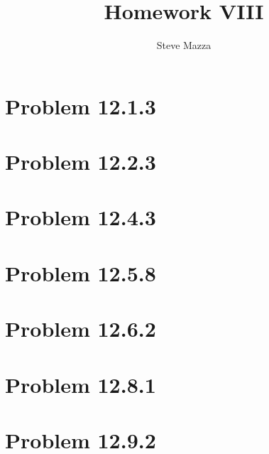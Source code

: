 \documentclass[letterpaper,10pt]{article}
\title{Homework VIII}
\author{Steve Mazza}
\begin{document}
\maketitle

\section*{Problem 12.1.3}

\section*{Problem 12.2.3}

\section*{Problem 12.4.3}

\section*{Problem 12.5.8}

\section*{Problem 12.6.2}

\section*{Problem 12.8.1}

\section*{Problem 12.9.2}
\end{document}
